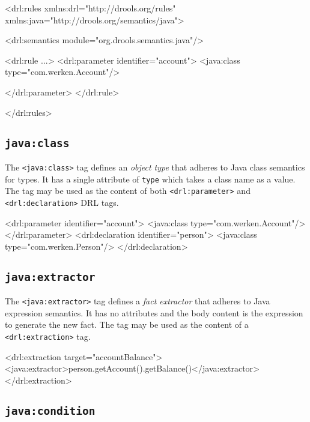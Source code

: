 \begin{codelisting}
\textcolor{light}{<drl:rules xmlns:drl="http://drools.org/rules"}
       xmlns:java="http://drools.org/semantics/java"\textcolor{light}{>}

  <drl:semantics module="org.drools.semantics.java"/>

  \textcolor{light}{<drl:rule ...>
    <drl:parameter identifier="account">}
      <java:class type="com.werken.Account"/>
    \textcolor{light}{</drl:parameter>
  </drl:rule>

</drl:rules>}
\end{codelisting}


\subsection{\texttt{java:class}}

The \verb|<java:class>| tag defines an \emph{object type} that adheres
to Java class semantics for types.  It has a single attribute of
\verb|type| which takes a class name as a value.  The tag may be
used as the content of both \verb|<drl:parameter>| and
\verb|<drl:declaration>| DRL tags.

\begin{codelisting}
\textcolor{light}{<drl:parameter identifier="account">}
  <java:class type="com.werken.Account"/>
\textcolor{light}{</drl:parameter>
<drl:declaration identifier="person">}
  <java:class type="com.werken.Person"/>
\textcolor{light}{</drl:declaration>}
\end{codelisting}

\subsection{\texttt{java:extractor}}

The \verb|<java:extractor>| tag defines a \emph{fact extractor}
that adheres to Java expression semantics.  It has
no attributes and the body content is the expression to generate
the new fact.  The tag may be used as the content of a 
\verb|<drl:extraction>| tag.

\begin{codelisting}
\textcolor{light}{<drl:extraction target="accountBalance">}
  <java:extractor>person.getAccount().getBalance()</java:extractor>
\textcolor{light}{</drl:extraction>}
\end{codelisting}

\subsection{\texttt{java:condition}}

